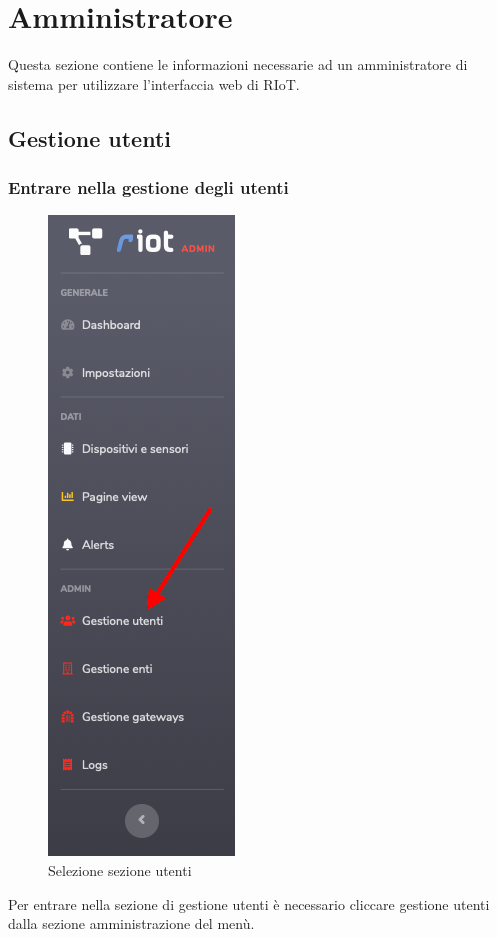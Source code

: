 \section{Amministratore}
Questa sezione contiene le informazioni necessarie ad un amministratore di sistema per utilizzare l'interfaccia web di RIoT.

\subsection{Gestione utenti}

	\subsubsection{Entrare nella gestione degli utenti}		
		\begin{figure}[H]
		\centering
		\includegraphics[scale=0.600]{res/images/admin/menuUtente.png}
		\caption{Selezione sezione utenti}
	\end{figure}

		Per entrare nella sezione di gestione utenti è necessario cliccare gestione utenti dalla sezione amministrazione del menù. 

